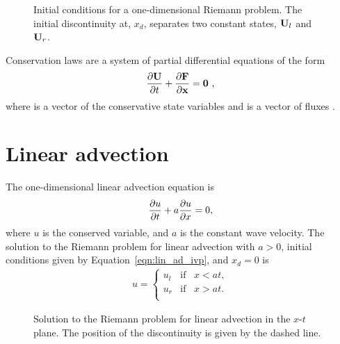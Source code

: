 \begin{figure}[htbp]
\begin{center}

\end{center}
\caption{Initial conditions for a one-dimensional Riemann problem.  The initial discontinuity at, $x_d$, separates two constant states, $\mathbf{U}_l$ and $\mathbf{U}_r$.}
\label{fig:ivp}
\end{figure}

Conservation laws are a system of partial differential equations of the form   
\begin{gather*}
\frac{\partial \mathbf{U}}{\partial t} + \frac{\partial \mathbf{F}}{\partial \mathbf{x}} = \mathbf{0} \text{ ,}
\end{gather*} 
where  is a vector of the conservative state variables and  is a vector of fluxes \citep{Toro:1999}. 


\section[Linear advection]{Linear advection}
\label{sec:lin_advec}

The one-dimensional linear advection equation is 
\begin{gather}
\label{eqn:linear_ad}
\frac{\partial u}{\partial t} + a\frac{\partial u}{\partial x} = 0,
\end{gather}
where $u$ is the conserved variable, and  $a$ is the constant wave velocity.  The solution to the Riemann problem for linear advection with $a>0$, initial conditions given by Equation~\ref{eqn:lin_ad_ivp}, and $x_d = 0$ is   
\begin{gather*}
\label{eqn:lin_ad_ivp} 
u = 
\begin{cases}
u_l & \text{if}\;\;\; x < at, \\
u_r & \text{if}\;\;\; x > at. \\
\end{cases}
\end{gather*} 

\begin{figure}[htbp]
\begin{center}

\end{center}
\caption{Solution to the Riemann problem for linear advection in the $x$-$t$ plane.  The position of the discontinuity is given by the dashed line.}
\label{fig:lin_ad_rstates}
\end{figure}

